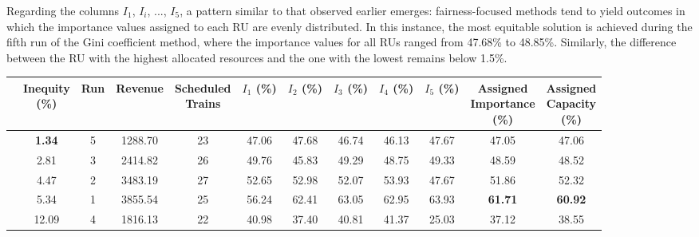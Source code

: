\documentclass[preprint,12pt]{elsarticle}
\begin{document}
Regarding the columns $I_1$, $I_i$, ..., $I_5$, a pattern similar to that observed earlier emerges: fairness-focused methods tend to yield outcomes in which the importance values assigned to each RU are evenly distributed. In this instance, the most equitable solution is achieved during the fifth run of the Gini coefficient method, where the importance values for all RUs ranged from 47.68\% to 48.85\%. Similarly, the difference between the RU with the highest allocated resources and the one with the lowest remains below 1.5\%.

\begin{table}[htbp]
\centering
\begin{adjustbox}{max width=\textwidth}
\begin{tabular}{|c|c|c|c|c|c|c|c|c|c|c|c|}
\cline{2-12}
 \multicolumn{1}{c|}{} & \makecell{\textbf{Inequity} \\ \textbf{(\%)}} & \textbf{Run} & \textbf{Revenue} & \makecell{\textbf{Scheduled} \\ \textbf{Trains}} & \makecell{\textbf{$I_1$} \\ \textbf{(\%)}} & \makecell{\textbf{$I_2$}  \\ \textbf{(\%)}} & \makecell{\textbf{$I_3$}  \\ \textbf{(\%)}} & \makecell{\textbf{$I_4$} \\ \textbf{(\%)}} & \makecell{\textbf{$I_5$} \\ \textbf{(\%)}} & \makecell{\textbf{Assigned} \\ \textbf{Importance} \\ \textbf{(\%)}} & \makecell{\textbf{Assigned} \\ \textbf{Capacity} \\ \textbf{(\%)}} \\ \cline{2-12} \hline

\parbox[t]{2mm}{} &
\textbf{1.34} & 5 & 1288.70 & 23 & 47.06 & 47.68 & 46.74 & 46.13 & 47.67 & 47.05 & 47.06 \\
& 2.81 & 3 & 2414.82 & 26 & 49.76 & 45.83 & 49.29 & 48.75 & 49.33 & 48.59 & 48.52 \\
& 4.47 & 2 & 3483.19 & 27 & 52.65 & 52.98 & 52.07 & 53.93 & 47.67 & 51.86 & 52.32 \\
& 5.34 & 1 & 3855.54 & 25 & 56.24 & 62.41 & 63.05 & 62.95 & 63.93 & \textbf{61.71 }& \textbf{60.92} \\
& 12.09 & 4 & 1816.13 & 22 & 40.98 & 37.40 & 40.81 & 41.37 & 25.03 & 37.12 & 38.55 \\ \hline


\end{tabular}
\end{adjustbox}
\end{table}
\end{document}

